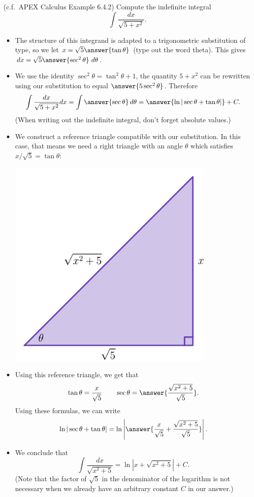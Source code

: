 \documentclass{ximera}
\begin{document}
\begin{example}
(c.f.~APEX Calculus Example 6.4.2) Compute the indefinite integral
\[ \int \frac{dx}{\sqrt{5 + x^2}}. \]
\begin{itemize}
\item The structure of this integrand is adapted to a trigonometric substitution of  type, so we let $x = \sqrt{5} \answer{\tan \theta}$ (type out the word theta). This gives $dx = \sqrt{5} \answer{\sec^2 \theta}~d \theta$.
\item We use the identity $\sec^2 \theta = \tan^2 \theta + 1$, the quantity $5 + x^2$ can be rewritten using our substitution to equal $\answer{5 \sec^2 \theta}$. Therefore
\[ \int \frac{dx}{\sqrt{5+x^2}} dx = \int \answer{\sec \theta} \, d \theta = \answer{\ln | \sec \theta + \tan \theta|} + C. \]
(When writing out the indefinite integral, don't forget absolute values.)
\item We construct a reference triangle compatible with our substitution. In this case, that means we need a right triangle with an angle $\theta$ which satisfies $x/\sqrt{5} = \tan \theta$:
\begin{center}
\begin{image}
\includegraphics[width=4in]{images/trigsub02.png}
\end{image}
\end{center}
\item Using this reference triangle, we get that
\[ \tan \theta = \frac{x}{\sqrt{5}} \qquad \sec \theta = \answer{ \frac{\sqrt{x^2+5}}{\sqrt{5}}}. \]
Using these formulas, we can write
\[ \ln |\sec \theta + \tan \theta| = \ln \left| \answer{\frac{x}{\sqrt{5}} + \frac{\sqrt{x^2+5}}{\sqrt{5}}} \right| . \]
\item We conclude that
\[ \int \frac{dx}{\sqrt{x^2+5}} = \ln | x + \sqrt{x^2 + 5} | + C. \]
(Note that the factor of $\sqrt{5}$ in the denominator of the logarithm is not necessary when we already have an arbitrary constant $C$ in our answer.)
\end{itemize}
\end{example}
\end{document}
